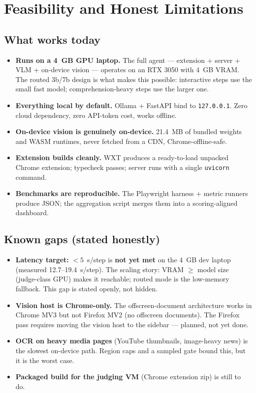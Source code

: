 \documentclass[11pt,a4paper]{article}
\newcommand{\code}[1]{\texttt{#1}}
\begin{document}
\section{Feasibility and Honest Limitations}

\subsection*{What works today}
\begin{itemize}
  \item \textbf{Runs on a 4~GB GPU laptop.} The full agent --- extension + server + VLM + on-device vision --- operates on an RTX 3050 with 4~GB VRAM. The routed 3b/7b design is what makes this possible: interactive steps use the small fast model; comprehension-heavy steps use the larger one.
  \item \textbf{Everything local by default.} Ollama + FastAPI bind to \code{127.0.0.1}. Zero cloud dependency, zero API-token cost, works offline.
  \item \textbf{On-device vision is genuinely on-device.} 21.4~MB of bundled weights and WASM runtimes, never fetched from a CDN, Chrome-offline-safe.
  \item \textbf{Extension builds cleanly.} WXT produces a ready-to-load unpacked Chrome extension; typecheck passes; server runs with a single \code{uvicorn} command.
  \item \textbf{Benchmarks are reproducible.} The Playwright harness + metric runners produce JSON; the aggregation script merges them into a scoring-aligned dashboard.
\end{itemize}

\subsection*{Known gaps (stated honestly)}
\begin{itemize}
  \item \textbf{Latency target:} $<5$~s/step is \textbf{not yet met} on the 4~GB dev laptop (measured 12.7--19.4~s/step). The scaling story: VRAM $\geq$ model size (judge-class GPU) makes it reachable; routed mode is the low-memory fallback. This gap is stated openly, not hidden.
  \item \textbf{Vision host is Chrome-only.} The offscreen-document architecture works in Chrome MV3 but not Firefox MV2 (no offscreen documents). The Firefox pass requires moving the vision host to the sidebar --- planned, not yet done.
  \item \textbf{OCR on heavy media pages} (YouTube thumbnails, image-heavy news) is the slowest on-device path. Region caps and a sampled gate bound this, but it is the worst case.
  \item \textbf{Packaged build for the judging VM} (Chrome extension zip) is still to do.
\end{itemize}
\end{document}
